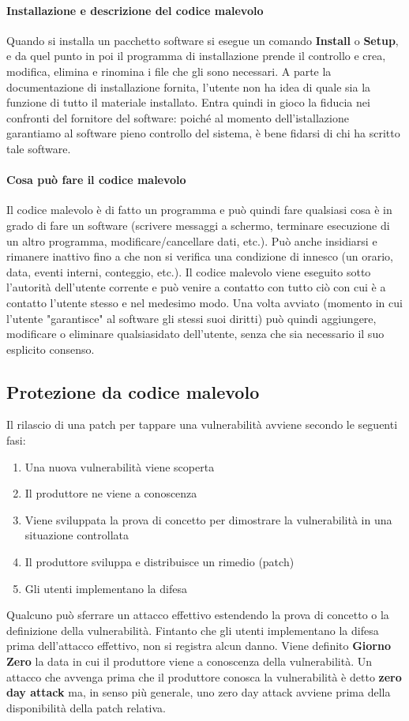 \paragraph{Installazione e descrizione del codice malevolo}
Quando si installa un pacchetto software si esegue un comando \textbf{Install} o \textbf{Setup}, e da quel punto in poi il programma di installazione prende il controllo e crea, modifica, elimina e rinomina i file che gli sono necessari. A parte la documentazione di installazione fornita, l'utente non ha idea di quale sia la funzione di tutto il materiale installato. Entra quindi in gioco la fiducia nei confronti del fornitore del software: poiché al momento dell'istallazione garantiamo al software pieno controllo del sistema, è bene fidarsi di chi ha scritto tale software.

\paragraph{Cosa può fare il codice malevolo}
Il codice malevolo è di fatto un programma e può quindi fare qualsiasi cosa è in grado di fare un software (scrivere messaggi a schermo, terminare esecuzione di un altro programma, modificare/cancellare dati, etc.).
Può anche insidiarsi e rimanere inattivo fino a che non si verifica una condizione di innesco (un orario, data, eventi interni, conteggio, etc.). Il codice malevolo viene eseguito sotto l'autorità dell'utente corrente e può venire a contatto con tutto ciò con cui è a contatto l'utente stesso e nel medesimo modo. Una volta avviato (momento in cui l'utente "garantisce" al software gli stessi suoi diritti) può quindi aggiungere, modificare o eliminare qualsiasidato dell’utente, senza che sia necessario il suo esplicito consenso.

\subsection{Protezione da codice malevolo}
Il rilascio di una patch per tappare una vulnerabilità avviene secondo le seguenti fasi:
\begin{enumerate}
\item Una nuova vulnerabilità viene scoperta
\item Il produttore ne viene a conoscenza
\item Viene sviluppata la prova di concetto per dimostrare la vulnerabilità in una situazione controllata
\item Il produttore sviluppa e distribuisce un rimedio (patch)
\item Gli utenti implementano la difesa
\end{enumerate}
Qualcuno può sferrare un attacco effettivo estendendo la prova di concetto o la definizione della vulnerabilità. Fintanto che gli utenti implementano la difesa prima dell'attacco effettivo, non si registra alcun danno.
Viene definito \textbf{Giorno Zero} la data in cui il produttore viene a conoscenza della vulnerabilità.
Un attacco che avvenga prima che il produttore conosca la vulnerabilità è detto \textbf{zero day attack} ma, in senso più generale, uno zero day attack avviene prima della disponibilità della patch relativa.

